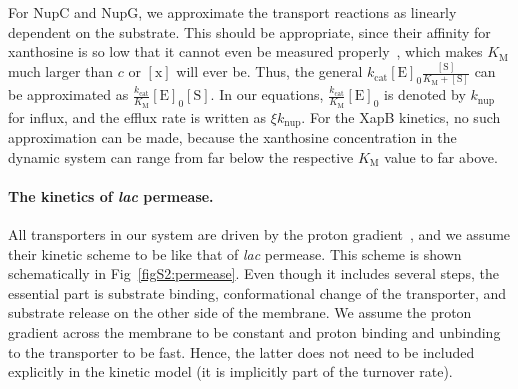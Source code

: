 \documentclass[10pt,letterpaper]{article}
\newcommand{\n}[1]{\mathrm{#1}}
\begin{document}
For NupC and NupG, we approximate the transport reactions as linearly dependent on the substrate. This should be appropriate, since their affinity for xanthosine is so low that it cannot even be measured properly~\cite{Norholm2001}, which makes $K_{\n{M}}$ much larger than $c$ or $\n{[x]}$ will ever be. Thus, the general $k_{\n{cat}} \n{[E]_0}
\frac{\n{[S]}}{K_{\n{M}} + \n{[S]}}$ can be approximated as
$\frac{k_{\n{cat}}}{K_{\n{M}}} \n{[E]_0} \n{[S]}$. In our equations,
$\frac{k_{\n{cat}}}{K_{\n{M}}} \n{[E]_0}$ is denoted by $k_{\n{nup}}$ for
influx, and the efflux rate is written as $\xi k_{\n{nup}}$. For the XapB
kinetics, no such approximation can be made, because the xanthosine
concentration in the dynamic system can range from far below the respective
$K_{\n{M}}$ value to far above.

\paragraph*{The kinetics of \emph{lac} permease.}
All transporters in our system are driven by the proton gradient~\cite{Norholm2001}, and we assume their kinetic scheme to be like that of \emph{lac} permease. This scheme is shown schematically in Fig~\ref{figS2:permease}.
Even though it includes several steps, the essential part is substrate binding, conformational change of the transporter, and substrate release on the other side of the membrane. We assume the proton gradient across the membrane to be constant and proton binding and unbinding to the transporter to be fast. Hence, the latter does not need to be included explicitly in the kinetic model (it is implicitly part of the turnover rate). 
\end{document}
